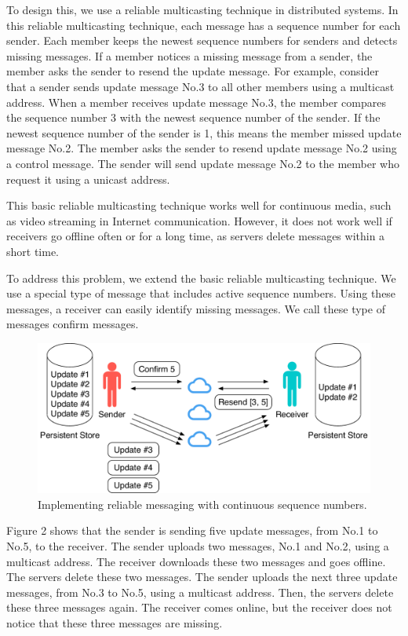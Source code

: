 \documentclass[sigconf]{acmart}
\begin{document}
To design this, we use a reliable multicasting technique in distributed systems\cite{tanenbaum2007distributed}.
In this reliable multicasting technique, each message has a sequence number for each sender.
Each member keeps the newest sequence numbers for senders and detects missing messages.
If a member notices a missing message from a sender, the member asks the sender to resend the update message.
For example, consider that a sender sends update message No.3 to all other members using a multicast address.
When a member receives update message No.3, the member compares the sequence number 3 with the newest sequence number of the sender.
If the newest sequence number of the sender is 1, this means the member missed update message No.2.
The member asks the sender to resend update message No.2 using a control message.
The sender will send update message No.2 to the member who request it using a unicast address.

This basic reliable multicasting technique works well for continuous media, such as video streaming in Internet communication.
However, it does not work well if receivers go offline often or for a long time, as servers delete messages within a short time.

To address this problem, we extend the basic reliable multicasting technique.
We use a special type of message that includes active sequence numbers.
Using these messages, a receiver can easily identify missing messages.
We call these type of messages confirm messages.

\begin{figure}[t]
	\centering
	\includegraphics[scale=0.38]{reliable_sync}
	\caption{Implementing reliable messaging with continuous sequence numbers.}
\end{figure}

Figure 2 shows that the sender is sending five update messages, from No.1 to No.5, to the receiver.
The sender uploads two messages, No.1 and No.2, using a multicast address.
The receiver downloads these two messages and goes offline.
The servers delete these two messages.
The sender uploads the next three update messages, from No.3 to No.5, using a multicast address.
Then, the servers delete these three messages again.
The receiver comes online, but the receiver does not notice that these three messages are missing.
\end{document}

